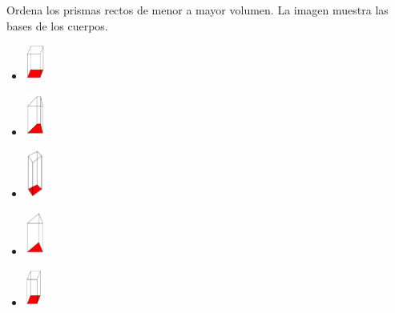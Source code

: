 \question Ordena los prismas rectos de menor a mayor volumen. La imagen muestra las bases de los cuerpos.
\begin{center}
\end{center}
\begin{itemize}
    \item[\rule{1cm}{0.2mm}] \includegraphics[width=0.05\textwidth ]{../images/sinma2_aiu3_ac80_img13}
    \item[\rule{1cm}{0.2mm}] \includegraphics[width=0.05\textwidth ]{../images/sinma2_aiu3_ac80_img11}
    \item[\rule{1cm}{0.2mm}] \includegraphics[width=0.05\textwidth ]{../images/sinma2_aiu3_ac80_img09}
    \item[\rule{1cm}{0.2mm}] \includegraphics[width=0.05\textwidth ]{../images/sinma2_aiu3_ac80_img10}
    \item[\rule{1cm}{0.2mm}] \includegraphics[width=0.05\textwidth ]{../images/sinma2_aiu3_ac80_img12}
\end{itemize}